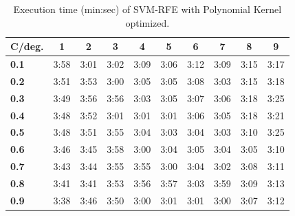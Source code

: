 \begin{table}[h]
    \centering
    \begin{tabular}{l | c c c|c c c|c c c}
        \toprule
        \multicolumn{1}{c}{\textbf{C/deg.}} & \textbf{1} & \textbf{2} & \textbf{3} & \textbf{4} & \textbf{5} & \textbf{6} & \textbf{7} & \textbf{8} & \textbf{9} \\
        \midrule
        \textbf{0.1} & 3:58 & 3:01 & 3:02 & 3:09 & 3:06 & 3:12 & 3:09 & 3:15 & 3:17\\
        \textbf{0.2} & 3:51 & 3:53 & 3:00 & 3:05 & 3:05 & 3:08 & 3:03 & 3:15 & 3:18\\
        \textbf{0.3} & 3:49 & 3:56 & 3:56 & 3:03 & 3:05 & 3:07 & 3:06 & 3:18 & 3:25\\
        \textbf{0.4} & 3:48 & 3:52 & 3:01 & 3:01 & 3:01 & 3:06 & 3:05 & 3:18 & 3:21\\
        \textbf{0.5} & 3:48 & 3:51 & 3:55 & 3:04 & 3:03 & 3:04 & 3:03 & 3:10 & 3:25\\
        \textbf{0.6} & 3:46 & 3:45 & 3:58 & 3:00 & 3:04 & 3:05 & 3:04 & 3:05 & 3:10\\
        \textbf{0.7} & 3:43 & 3:44 & 3:55 & 3:55 & 3:00 & 3:04 & 3:02 & 3:08 & 3:11\\
        \textbf{0.8} & 3:41 & 3:41 & 3:53 & 3:56 & 3:57 & 3:03 & 3:59 & 3:09 & 3:13\\
        \textbf{0.9} & 3:38 & 3:46 & 3:50 & 3:00 & 3:01 & 3:01 & 3:00 & 3:07 & 3:12\\
        \bottomrule
        \end{tabular}
    \caption{Execution time (min:sec) of SVM-RFE with Polynomial Kernel optimized.}
\end{table}


